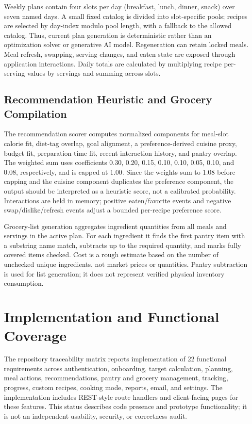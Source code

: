 \documentclass[10pt,twocolumn]{article}
\begin{document}
Weekly plans contain four slots per day (breakfast, lunch, dinner, snack) over seven named days. A small fixed catalog is divided into slot-specific pools; recipes are selected by day-index modulo pool length, with a fallback to the allowed catalog. Thus, current plan generation is deterministic rather than an optimization solver or generative AI model. Regeneration can retain locked meals. Meal refresh, swapping, serving changes, and eaten state are exposed through application interactions. Daily totals are calculated by multiplying recipe per-serving values by servings and summing across slots.

\subsection{Recommendation Heuristic and Grocery Compilation}
The recommendation scorer computes normalized components for meal-slot calorie fit, diet-tag overlap, goal alignment, a preference-derived cuisine proxy, budget fit, preparation-time fit, recent interaction history, and pantry overlap. The weighted sum uses coefficients 0.30, 0.20, 0.15, 0.10, 0.10, 0.05, 0.10, and 0.08, respectively, and is capped at 1.00. Since the weights sum to 1.08 before capping and the cuisine component duplicates the preference component, the output should be interpreted as a heuristic score, not a calibrated probability. Interactions are held in memory; positive eaten/favorite events and negative swap/dislike/refresh events adjust a bounded per-recipe preference score.

Grocery-list generation aggregates ingredient quantities from all meals and servings in the active plan. For each ingredient it finds the first pantry item with a substring name match, subtracts up to the required quantity, and marks fully covered items checked. Cost is a rough estimate based on the number of unchecked unique ingredients, not market prices or quantities. Pantry subtraction is used for list generation; it does not represent verified physical inventory consumption.

\section{Implementation and Functional Coverage}
The repository traceability matrix reports implementation of 22 functional requirements across authentication, onboarding, target calculation, planning, meal actions, recommendations, pantry and grocery management, tracking, progress, custom recipes, cooking mode, reports, email, and settings. The implementation includes REST-style route handlers and client-facing pages for these features. This status describes code presence and prototype functionality; it is not an independent usability, security, or correctness audit.
\end{document}
